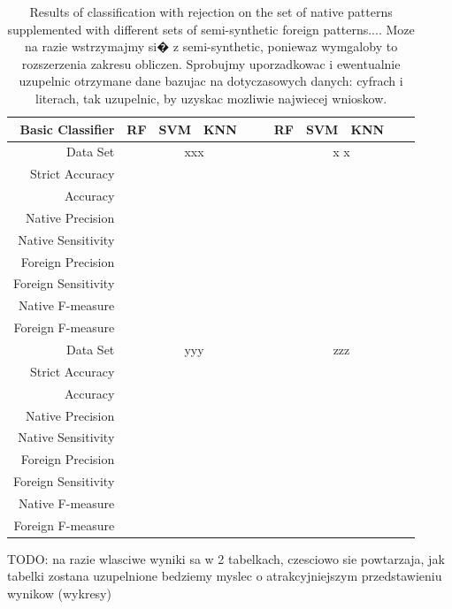 \documentclass{llncs}
\begin{document}
\begin{table}[!ht]
\centering
\caption{Results of classification with rejection on the set of native patterns supplemented with different sets of semi-synthetic foreign patterns.... \color{red}Moze na razie wstrzymajmy si� z semi-synthetic, poniewaz wymgaloby to rozszerzenia zakresu obliczen. Sprobujmy uporzadkowac i ewentualnie uzupelnic otrzymane dane bazujac na dotyczasowych danych: cyfrach i literach, tak uzupelnic, by uzyskac mozliwie najwiecej wnioskow.}
\setlength{\tabcolsep}{4pt}
\renewcommand{\arraystretch}{1}
\begin{tabular}{||r||ccccc||ccccc||}
\hline
  Basic Classifier & RF & SVM & KNN &  &  &  RF & SVM & KNN &  &  \\
\hline
  Data Set & \multicolumn{5}{c||}{ xxx } & \multicolumn{5}{c|}{ x x } \\
\hline
\hline
Strict Accuracy     &&&&&&&&&& \\
Accuracy            &&&&&&&&&& \\
Native Precision    &&&&&&&&&&  \\
Native Sensitivity  &&&&&&&&&&  \\
Foreign Precision   &&&&&&&&&&  \\
Foreign Sensitivity &&&&&&&&&&  \\
Native F-measure    &&&&&&&&&& \\
Foreign F-measure   &&&&&&&&&&  \\
\hline
\hline
  Data Set & \multicolumn{5}{c||}{ yyy } & \multicolumn{5}{c|}{ zzz } \\
\hline
\hline
Strict Accuracy     &&&&&&&&&&  \\
Accuracy            &&&&&&&&&& \\
Native Precision    &&&&&&&&&&  \\
Native Sensitivity  &&&&&&&&&&  \\
Foreign Precision   &&&&&&&&&&  \\
Foreign Sensitivity &&&&&&&&&& \\
Native F-measure    &&&&&&&&&&  \\
Foreign F-measure   &&&&&&&&&&  \\
   \hline
\end{tabular}
\label{tab:rejection_results}
\end{table}
{\color{blue}
TODO: na razie wlasciwe wyniki sa w 2 tabelkach, czesciowo sie powtarzaja, jak tabelki zostana uzupelnione bedziemy myslec o atrakcyjniejszym przedstawieniu wynikow (wykresy)
}
\end{document}
